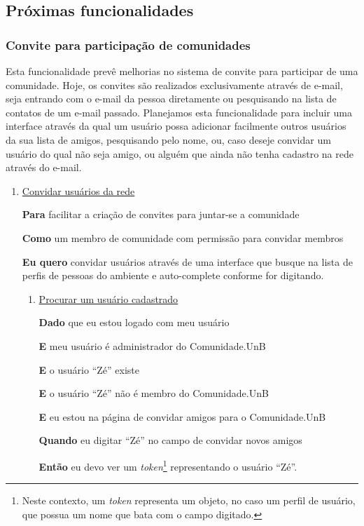 \subsection{Próximas funcionalidades}

\subsubsection{Convite para participação de comunidades}

Esta funcionalidade prevê melhorias no sistema de convite para participar de
uma comunidade. Hoje, os convites são realizados
exclusivamente através de e-mail, seja entrando com o e-mail da pessoa
diretamente ou pesquisando na lista de contatos de um e-mail passado.
%
Planejamos esta funcionalidade para incluir uma interface através da qual um
usuário possa adicionar facilmente outros usuários da sua lista de amigos,
pesquisando pelo nome, ou, caso deseje convidar um usuário do qual não seja
amigo, ou alguém que ainda não tenha cadastro na rede através do e-mail.


\begin{enumerate}

\item \underline{Convidar usuários da rede}

	\textbf{Para} facilitar a criação de convites para juntar-se a comunidade

	\textbf{Como} um membro de comunidade com permissão para convidar membros

	\textbf{Eu quero} convidar usuários através de uma interface que busque na lista
	de perfis de pessoas do ambiente e auto-complete conforme for digitando.


	\begin{enumerate}

		\item \underline{Procurar um usuário cadastrado}

		\textbf{Dado} que eu estou logado com meu usuário

		\textbf{E} meu usuário é administrador do Comunidade.UnB

		\textbf{E} o usuário ``Zé'' existe

		\textbf{E} o usuário ``Zé'' não é membro do Comunidade.UnB

		\textbf{E} eu estou na página de convidar amigos para o Comunidade.UnB

		\textbf{Quando} eu digitar ``Zé'' no campo de convidar novos amigos

		\textbf{Então} eu devo ver um \textit{token}\footnote{Neste contexto, um
		\textit{token} representa um objeto, no caso um perfil de usuário, que possua
		um nome que bata com o campo digitado.} representando o usuário ``Zé''.

	\end{enumerate}


\end{enumerate}

